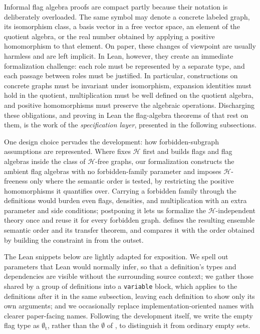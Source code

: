 \documentclass[acmsmall,screen=true,acmthm=false]{acmart}
\DeclareRobustCommand{\lean}[1]{{\def\_{\textunderscore\allowbreak}\texttt{#1}}}
\newcommand{\emptyt}{\emptyset_{\mathrm{t}}}
\begin{document}
Informal flag algebra proofs are compact partly because their notation is
deliberately overloaded.  The same symbol may denote a concrete labeled graph,
its isomorphism class, a basis vector in a free vector space, an element of the
quotient algebra, or the real number obtained by applying a positive
homomorphism to that element.  On paper, these changes of viewpoint are usually
harmless and are left implicit.  In Lean, however, they create an immediate
formalization challenge: each role must be represented by a separate type, and
each passage between roles must be justified.  In particular, constructions
on concrete graphs must be invariant under isomorphism, expansion identities
must hold in the quotient, multiplication must be well defined on the quotient
algebra, and positive homomorphisms must preserve the algebraic operations.
Discharging these obligations, and proving in Lean the flag-algebra theorems
of  that rest on them, is the work of the
\emph{specification layer}, presented in the following subsections.

One design choice pervades the development: how forbidden-subgraph assumptions
are represented.  Where
 fixes \(\mathcal{H}\) first and builds flags and flag
algebras inside the class of \(\mathcal{H}\)-free graphs, our formalization
constructs the ambient flag algebras with no forbidden-family parameter and
imposes \(\mathcal{H}\)-freeness only where the semantic order is tested, by
restricting the positive homomorphisms it quantifies over.  Carrying a
forbidden family through the definitions would burden even flags, densities,
and multiplication with an extra parameter and side conditions; postponing it
lets us formalize the \(\mathcal{H}\)-independent theory once and reuse it for
every forbidden graph.   defines the resulting ensemble
semantic order and its transfer theorem, and  compares it
with the order obtained by building the constraint in from the outset.

The Lean snippets below are lightly adapted for exposition.  We spell out
parameters that Lean would normally infer, so that a definition's types and
dependencies are visible without the surrounding source context; we gather
those shared by a group of definitions into a \lean{variable} block, which
applies to the definitions after it in the same subsection, leaving
each definition to show only its own arguments; and we occasionally replace
implementation-oriented names with clearer paper-facing names.  Following the
development itself, we write the empty flag type as \(\emptyt\), rather than
the \(\emptyset\) of , to distinguish it from ordinary
empty sets.
\end{document}
